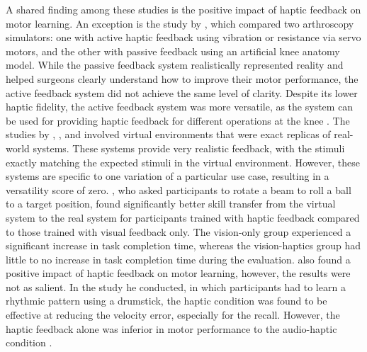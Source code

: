 A shared finding among these studies is the positive impact of haptic feedback on motor learning. An exception is the study by \cite{Vaghela2021}, which compared two arthroscopy simulators: one with active haptic feedback using vibration or resistance via servo motors, and the other with passive feedback using an artificial knee anatomy model. While the passive feedback system realistically represented reality and helped surgeons clearly understand how to improve their motor performance, the active feedback system did not achieve the same level of clarity. Despite its lower haptic fidelity, the active feedback system was more versatile, as the system can be used for providing haptic feedback for different operations at the knee \cite{Vaghela2021}.
The studies by \cite{Vaghela2021}, \cite{Huang2006}, and \cite{Graham2008} involved virtual environments that were exact replicas of real-world systems. These systems provide very realistic feedback, with the stimuli exactly matching the expected stimuli in the virtual environment. However, these systems are specific to one variation of a particular use case, resulting in a versatility score of zero. \cite{Huang2006}, who asked participants to rotate a beam to roll a ball to a target position, found significantly better skill transfer from the virtual system to the real system for participants trained with haptic feedback compared to those trained with visual feedback only. The vision-only group experienced a significant increase in task completion time, whereas the vision-haptics group had little to no increase in task completion time during the evaluation. \cite{Graham2008} also found a positive impact of haptic feedback on motor learning, however, the results were not as salient. In the study he conducted, in which participants had to learn a rhythmic pattern using a drumstick, the haptic condition was found to be effective at reducing the velocity error, especially for the recall. However, the haptic feedback alone was inferior in motor performance to the audio-haptic condition \cite{Graham2008}. 


